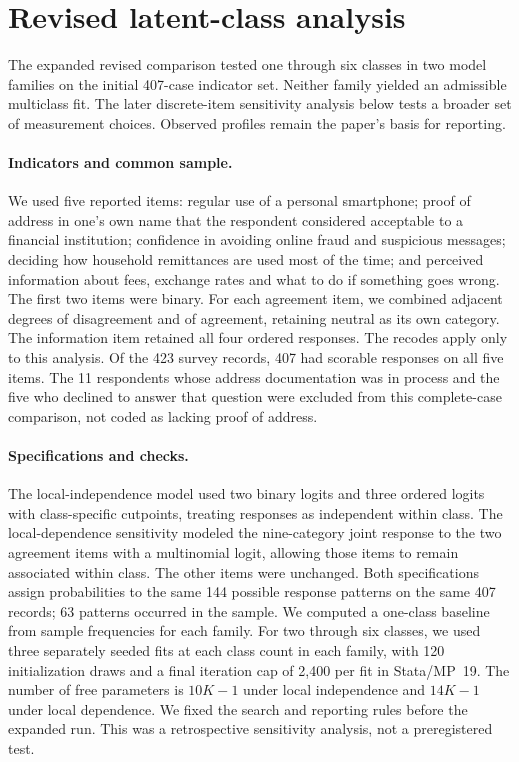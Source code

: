 \section{Revised latent-class analysis}
\label{sec:revised-lca}

The expanded revised comparison tested one through six classes in two model
families on the initial 407-case indicator set. Neither family yielded an
admissible multiclass fit. The later discrete-item sensitivity analysis below
tests a broader set of measurement choices. Observed profiles remain the
paper's basis for reporting.

\paragraph{Indicators and common sample.}
We used five reported items: regular use of a personal smartphone; proof of
address in one's own name that the respondent considered acceptable to a
financial institution; confidence in avoiding online fraud and suspicious
messages; deciding how household remittances are used most of the time; and
perceived information about fees, exchange rates and what to do if something
goes wrong. The first two items were binary. For each agreement item, we
combined adjacent degrees of disagreement and of agreement, retaining neutral
as its own category. The information item retained all four ordered responses.
The recodes apply only to this analysis. Of the 423 survey records, 407 had
scorable responses on all five items. The 11 respondents whose address
documentation was in process and the five who declined to answer that
question were excluded from this complete-case comparison, not coded as
lacking proof of address.

\paragraph{Specifications and checks.}
The local-independence model used two binary logits and three ordered logits
with class-specific cutpoints, treating responses as independent within class.
The local-dependence sensitivity modeled the nine-category joint response
to the two agreement items with a multinomial logit, allowing those items
to remain associated within class. The other items were unchanged. Both
specifications assign probabilities to the same 144 possible response
patterns on the same 407 records; 63 patterns occurred in the sample.
We computed a one-class baseline from sample frequencies for each family.
For two through six classes, we used three separately seeded fits at each
class count in each family, with 120 initialization draws and a final
iteration cap of 2,400 per fit in Stata/MP~19. The number of free parameters
is $10K-1$ under local independence and $14K-1$ under local dependence.
We fixed the search and reporting rules before the expanded run. This
was a retrospective sensitivity analysis, not a preregistered test.

